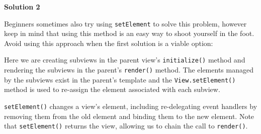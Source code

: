 \documentclass[9pt]{book}
\newenvironment{Shaded}{}{}
\newcommand{\KeywordTok}[1]{\textcolor[rgb]{0.00,0.44,0.13}{\textbf{{#1}}}}
\newcommand{\StringTok}[1]{\textcolor[rgb]{0.25,0.44,0.63}{{#1}}}
\newcommand{\CommentTok}[1]{\textcolor[rgb]{0.38,0.63,0.69}{\textit{{#1}}}}
\newcommand{\OtherTok}[1]{\textcolor[rgb]{0.00,0.44,0.13}{{#1}}}
\newcommand{\FunctionTok}[1]{\textcolor[rgb]{0.02,0.16,0.49}{{#1}}}
\newcommand{\NormalTok}[1]{{#1}}
\begin{document}
\textbf{Solution 2}

Beginners sometimes also try using \texttt{setElement} to solve this
problem, however keep in mind that using this method is an easy way to
shoot yourself in the foot. Avoid using this approach when the first
solution is a viable option:

\begin{Shaded}
\end{Shaded}

Here we are creating subviews in the parent view's \texttt{initialize()}
method and rendering the subviews in the parent's \texttt{render()}
method. The elements managed by the subviews exist in the parent's
template and the \texttt{View.setElement()} method is used to re-assign
the element associated with each subview.

\texttt{setElement()} changes a view's element, including re-delegating
event handlers by removing them from the old element and binding them to
the new element. Note that \texttt{setElement()} returns the view,
allowing us to chain the call to \texttt{render()}.
\end{document}
